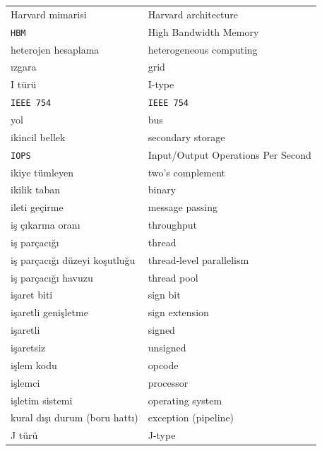 {\begin{longtable}{@{}p{7.6cm}p{7.6cm}@{}}

Harvard mimarisi & Harvard architecture \\
\texttt{HBM} & High Bandwidth Memory \\
heterojen hesaplama & heterogeneous computing \\

ızgara & grid \\

I türü & I-type \\
\texttt{IEEE 754} & \texttt{IEEE 754} \\
yol & bus \\
ikincil bellek & secondary storage \\
\texttt{IOPS} & Input/Output Operations Per Second \\
ikiye tümleyen & two's complement \\
ikilik taban & binary \\
ileti geçirme & message passing \\
iş çıkarma oranı & throughput \\
iş parçacığı & thread \\
iş parçacığı düzeyi koşutluğu & thread-level parallelism \\
iş parçacığı havuzu & thread pool \\
işaret biti & sign bit \\
işaretli genişletme & sign extension \\
işaretli & signed \\
işaretsiz & unsigned \\
işlem kodu & opcode \\
işlemci & processor \\
işletim sistemi & operating system \\
kural dışı durum (boru hattı) & exception (pipeline) \\

J türü & J-type \\


\end{longtable}}
